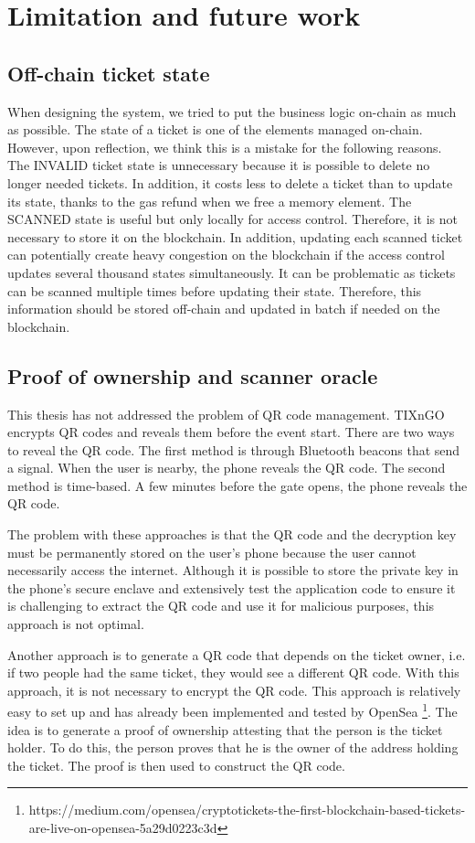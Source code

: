 \documentclass[a4paper,11pt,oneside]{report}
\begin{document}
\chapter{Limitation and future work}

\section{Off-chain ticket state}
When designing the system, we tried to put the business logic on-chain as much as possible. The state of a ticket is one of the elements managed on-chain. However, upon reflection, we think this is a mistake for the following reasons. The INVALID ticket state is unnecessary because it is possible to delete no longer needed tickets. In addition, it costs less to delete a ticket than to update its state, thanks to the gas refund when we free a memory element. The SCANNED state is useful but only locally for access control. Therefore, it is not necessary to store it on the blockchain. In addition, updating each scanned ticket can potentially create heavy congestion on the blockchain if the access control updates several thousand states simultaneously. It can be problematic as tickets can be scanned multiple times before updating their state. Therefore, this information should be stored off-chain and updated in batch if needed on the blockchain. 

\section{Proof of ownership and scanner oracle}
This thesis has not addressed the problem of QR code management. TIXnGO encrypts QR codes and reveals them before the event start. There are two ways to reveal the QR code. The first method is through Bluetooth beacons that send a signal. When the user is nearby, the phone reveals the QR code. The second method is time-based. A few minutes before the gate opens, the phone reveals the QR code.

The problem with these approaches is that the QR code and the decryption key must be permanently stored on the user's phone because the user cannot necessarily access the internet. Although it is possible to store the private key in the phone's secure enclave and extensively test the application code to ensure it is challenging to extract the QR code and use it for malicious purposes, this approach is not optimal.

Another approach is to generate a QR code that depends on the ticket owner, i.e. if two people had the same ticket, they would see a different QR code. With this approach, it is not necessary to encrypt the QR code. This approach is relatively easy to set up and has already been implemented and tested by OpenSea \footnote{https://medium.com/opensea/cryptotickets-the-first-blockchain-based-tickets-are-live-on-opensea-5a29d0223c3d}. The idea is to generate a proof of ownership attesting that the person is the ticket holder. To do this, the person proves that he is the owner of the address holding the ticket. The proof is then used to construct the QR code.
\end{document}
